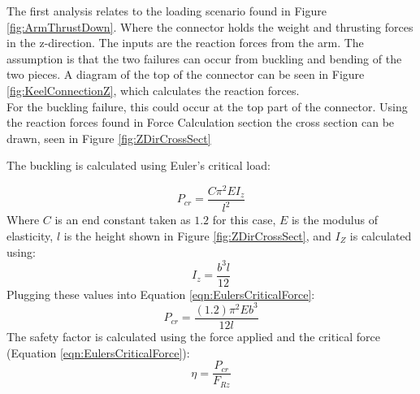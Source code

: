 \documentclass[../main.tex]{subfiles}
\begin{document}
The first analysis relates to the loading scenario found in Figure \ref{fig:ArmThrustDown}. Where the connector holds the weight and thrusting forces in the z-direction. The inputs are the reaction forces from the arm. The assumption is that the two failures can occur from buckling and bending of the two pieces. A diagram of the top of the connector can be seen in Figure \ref{fig:KeelConnectionZ}, which calculates the reaction forces.\\

For the buckling failure, this could occur at the top part of the connector. Using the reaction forces found in Force Calculation section the cross section can be drawn, seen in Figure \ref{fig:ZDirCrossSect}


\noindent The buckling is calculated using Euler's critical load:

\begin{equation} \label{eqn:EulersCriticalForce}
P_{cr} = \frac{C\pi^2EI_z}{l^2}
\end{equation}
Where $C$ is an end constant taken as $1.2$ for this case, $E$ is the modulus of elasticity, $l$ is the height shown in Figure \ref{fig:ZDirCrossSect}, and $I_Z$ is calculated using:
\begin{equation}
I_z = \frac{b^3l}{12}
\end{equation}
Plugging these values into Equation \ref{eqn:EulersCriticalForce}:
\begin{equation}
P_{cr} = \frac{(1.2)\pi^2Eb^3}{12l}
\end{equation}
The safety factor is calculated using the force applied and the critical force (Equation \ref{eqn:EulersCriticalForce}):
\begin{equation}
\eta = \frac{P_{cr}}{F_{Rz}}
\end{equation}
\end{document}
